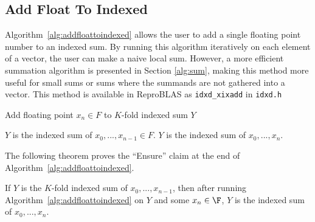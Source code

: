 \subsection{Add Float To Indexed}
  \label{sec:primitiveops_addfloattoindexed}
  Algorithm~\ref{alg:addfloattoindexed} allows the user to add a single floating
  point number to an indexed sum. By running this algorithm iteratively on each
  element of a vector, the user can make a naive local sum. However, a more
  efficient summation algorithm is presented in Section \ref{alg:sum}, making this method more useful for small sums or sums where the summands are not gathered into a vector. 
  This method is available in ReproBLAS as \texttt{idxd_xixadd} in \texttt{idxd.h}

  \begin{alg}
    Add floating point $x_n \in F$ to $K$-fold indexed sum $Y$
    \label{alg:addfloattoindexed}
    \begin{algorithmic}[1]
      \Require
        $Y$ is the indexed sum of $x_0, ..., x_{n - 1} \in F$.
        \State {}
        \State {}
        \State {}
      \EndFunction
      \Ensure
        $Y$ is the indexed sum of $x_0, ..., x_{n}$.
    \end{algorithmic}
  \end{alg}

  The following theorem proves the ``Ensure'' claim at the end of Algorithm~\ref{alg:addfloattoindexed}.
  \begin{thm}
    If $Y$ is the $K$-fold indexed sum of $x_0, ..., x_{n - 1}$, then after
    running Algorithm~\ref{alg:addfloattoindexed} on $Y$ and some $x_n \in \F$,
    $Y$ is the indexed sum of $x_0, ..., x_n$.
    \label{thm:addfloattoindexed}
  \end{thm}


